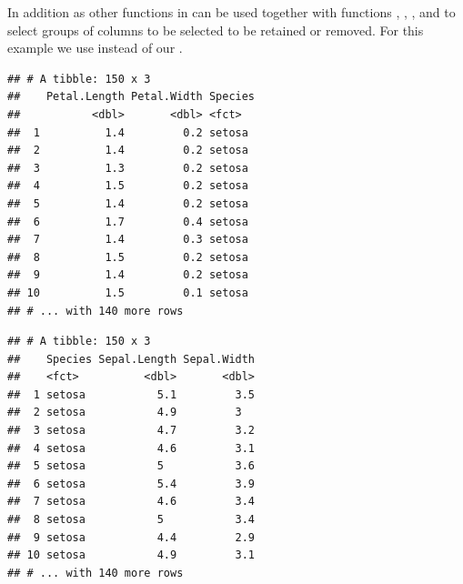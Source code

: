 \documentclass[krantz2]{krantz}\usepackage{knitr}%
\begin{document}
In addition  as other functions in  can be used together with functions , , , and  to select groups of columns to be selected to be retained or removed. For this example we use \Rlang {} instead of our .

\begin{knitrout}\footnotesize
{}\color{fgcolor}\begin{kframe}
\begin{alltt}
 \hlopt{-}\hlstd{(}\hlstd{))}
\end{alltt}
\begin{verbatim}
## # A tibble: 150 x 3
##    Petal.Length Petal.Width Species
##           <dbl>       <dbl> <fct>  
##  1          1.4         0.2 setosa 
##  2          1.4         0.2 setosa 
##  3          1.3         0.2 setosa 
##  4          1.5         0.2 setosa 
##  5          1.4         0.2 setosa 
##  6          1.7         0.4 setosa 
##  7          1.4         0.3 setosa 
##  8          1.5         0.2 setosa 
##  9          1.4         0.2 setosa 
## 10          1.5         0.1 setosa 
## # ... with 140 more rows
\end{verbatim}
\end{kframe}
\end{knitrout}

\begin{knitrout}\footnotesize
{}\color{fgcolor}\begin{kframe}
\begin{alltt}
 \hlstd{(}\hlstd{))}
\end{alltt}
\begin{verbatim}
## # A tibble: 150 x 3
##    Species Sepal.Length Sepal.Width
##    <fct>          <dbl>       <dbl>
##  1 setosa           5.1         3.5
##  2 setosa           4.9         3  
##  3 setosa           4.7         3.2
##  4 setosa           4.6         3.1
##  5 setosa           5           3.6
##  6 setosa           5.4         3.9
##  7 setosa           4.6         3.4
##  8 setosa           5           3.4
##  9 setosa           4.4         2.9
## 10 setosa           4.9         3.1
## # ... with 140 more rows
\end{verbatim}
\end{kframe}
\end{knitrout}
\end{document}
